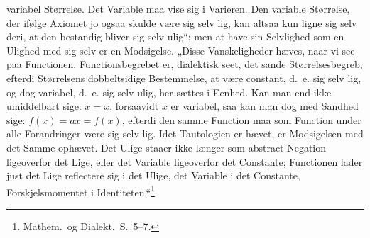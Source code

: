 \documentclass[12pt]{book}
\newcommand{\opage}[1]{\marginnote{\footnotesize\textit{[#1]}}}
\begin{document}
variabel
\opage{299} Størrelse. Det Variable maa vise sig i Varieren. Den variable Størrelse, der ifølge Axiomet jo ogsaa
skulde være sig selv lig, kan altsaa kun ligne sig selv deri, at den bestandig bliver sig selv ulig“;
men at have sin Selvlighed som en Ulighed med sig selv er en Modsigelse. „Disse Vanskeligheder hæves,
naar vi see paa Functionen. Functionsbegrebet er, dialektisk seet, det sande Størrelsesbegreb, efterdi
Størrelsens dobbeltsidige Bestemmelse, at være constant, d.\ e. sig selv lig, og dog variabel, d.\ e.
sig selv ulig, her sættes i Eenhed. Kan man end ikke umiddelbart sige: $x = x$, forsaavidt $x$ er
variabel, saa kan man dog med Sandhed sige: $f(x) = ax = f(x)$, efterdi den samme Function maa som
Function under alle Forandringer være sig selv lig. Idet Tautologien er hævet, er Modsigelsen med det
Samme ophævet. Det Ulige staaer ikke længer som abstract Negation ligeoverfor det Lige, eller det
Variable ligeoverfor det Constante; Functionen lader just det Lige reflectere sig i det Ulige, det
Variable i det Constante, Forskjelsmomentet i Identiteten.“\footnote{Mathem.\ og Dialekt.\ S.~5--7.}
\end{document}
